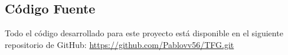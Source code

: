 \documentclass[12pt, a4paper, twoside]{article}
\begin{document}


\begin{umaappendices}
\section{Código Fuente}
Todo el código desarrollado para este proyecto está disponible en el siguiente repositorio de GitHub\cite{github}: \href{https://github.com/Pablovv56/TFG.git}{https://github.com/Pablovv56/TFG.git}
\end{umaappendices}


\end{document}
